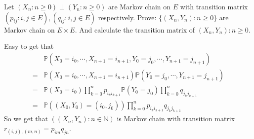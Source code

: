 \documentclass{ctexart}
\newif\ifpreface
\begin{document}
\large
\setlength{\baselineskip}{1.2em}
\ifpreface
  
\else
\fi
{}
\allowdisplaybreaks[4]
\begin{problem}\label{pro:1}
  Let \((X_n:n \geq 0)\perp (Y_n: n \geq 0)\) are Markov chain on \(E\) with
  transition matrix \((p_{ij}:i,j \in E),(q_{ij}:i,j \in E)\) respectively.
  Prove: \(\{(X_n,Y_n):n \geq 0\}\) are Markov chain on \(E \times E\).
  And calculate the transition matrix of \((X_n,Y_n):n \geq 0\).
\end{problem}
\begin{solution}
  Easy to get that
  \[
    \begin{aligned}
       & \mathbb{P}(X_0=i_0,\cdots,X_{n+1} =i_{n+1},Y_0=j_0,\cdots,Y_{n+1}=j_{n+1})
      \\= & \mathbb{P}(X_0=i_0,\cdots,X_{n+1} =i_{n+1})\mathbb{P}(Y_0=j_0,\cdots,Y_{n+1}=j_{n+1})
      \\= & \mathbb{P}(X_0=i_0)\prod_{k=0}^{n} p_{i_k i_{k+1} } \mathbb{P}(Y_0=j_0) \prod_{k=0}^{n} q_{j_k j_{k+1}}
      \\=& \mathbb{P}((X_0,Y_0)=(i_0,j_0)) \prod_{k=0}^{n} p_{i_k i_{k+1} } q_{j_k j_{k+1}}
    \end{aligned}
  \]
  So we get that \(\left((X_n,Y_n): n \in \mathbb{N}\right)\) is Markov chain with transition matrix
  \(r_{(i,j),(m,n)}=p_{im}q_{jn}\).
\end{solution}
\end{document}
